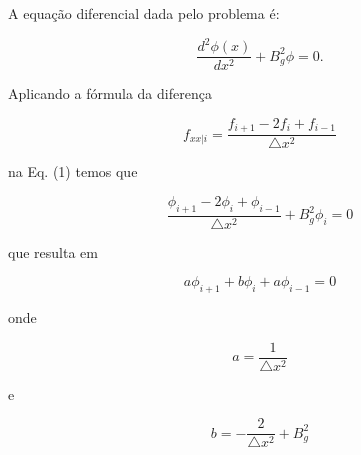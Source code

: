\documentclass{article}
\begin{document}
    A equação diferencial dada pelo problema é:
    
    \begin{equation}
        \frac{d^2\phi(x)}{dx^2}  + B_g^2 \phi = 0.
    \end{equation}
    
    Aplicando a fórmula da diferença
    
    \begin{equation}
        f_{xx|i} = \frac{f_{i+1} - 2 f_i + f_{i-1}}{\triangle x^2} 
    \end{equation}
    
    na Eq. (1) temos que
    
    \begin{equation}
        \frac{\phi_{i+1} - 2 \phi_i + \phi_{i-1}}{\triangle x^2} + B_g^2 \phi_i = 0
    \end{equation}
    
    que resulta em
    
    \begin{equation}
        a \phi_{i+1} + b \phi_i + a \phi_{i-1} = 0
    \end{equation}
    
    onde
    
    \begin{equation}
        a = \frac{1}{\triangle x^2}
    \end{equation}
    
    e
    
    \begin{equation}
        b = -\frac{2}{\triangle x^2} + B_g^2
    \end{equation}
    
\end{document}
